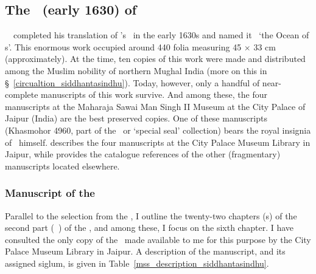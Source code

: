 \subsection{The \Siddhantasindhu\ (\circa early 1630) of \Nityananda}\label{siddhantasindhu_nityananda} 

\Pandita\ \Nityanandafull\ completed his translation of \MullaFarid's \ZijiShahJahani\ in the early 1630s and named it \Siddhantasindhu\ `the Ocean of \Siddhanta s'. This enormous work occupied around 440 folia measuring 45 $\times$ 33 cm (approximately). At the time, ten copies of this work were made and distributed among the Muslim nobility of northern Mughal India (more on this in \S~\ref{circualtion_siddhantasindhu}). Today, however, only a handful of near-complete manuscripts of this work survive. And among these, the four manuscripts at the Maharaja Sawai Man Singh II Museum at the City Palace of Jaipur (India) are the best preserved copies. One of these manuscripts (Khasmohor 4960, part of the \khasmohor\ or `special seal' collection) bears the royal insignia of \Shahjahan\ himself. \textcite[138--143]{PingreeJaipur} describes the four manuscripts at the City Palace Museum Library in Jaipur, while \textcites[p.\thinspace 173b in Volume A3 and p.\thinspace 184a in Volume A5]{PingreeCESS} provides the catalogue references of the other (fragmentary) manuscripts located elsewhere.

\subsubsection{Manuscript of the \Siddhantasindhu} \label{manuscript_siddhantasindhu} 
Parallel to the selection from the \ZijiShahJahani, I outline the twenty-two chapters (\adhyaya s) of the second part (\dvitiya\ \kanda) of the \Siddhantasindhu, and among these, I focus on the sixth chapter. I have consulted the only copy of the \Siddhantasindhu\ made available to me for this purpose by the City Palace Museum Library in Jaipur. A description of the manuscript, and its assigned siglum, is given in Table~\ref{mss_description_siddhantasindhu}.

